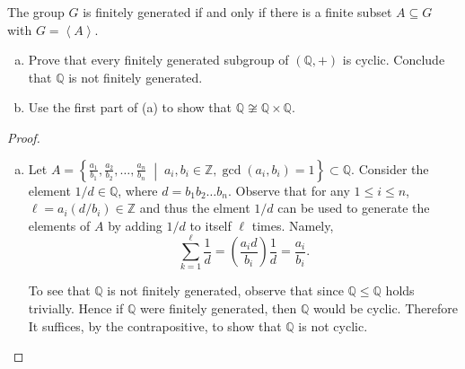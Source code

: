 \documentclass[10pt]{amsart}
\begin{document}
\begin{thm}
  The group $G$ is finitely generated if and only if there is a finite subset $A \subseteq G$ with $G = \left< A \right>$.
  
  \begin{enumerate}[(a)]
  \item
    Prove that every finitely generated subgroup of $(\mathbb{Q}, +)$ is cyclic.
    Conclude that $\mathbb{Q}$ is not finitely generated.
  \item
    Use the first part of (a) to show that $\mathbb{Q} \not \cong \mathbb{Q} \times \mathbb{Q}$.
  \end{enumerate}
  \begin{proof}
    \begin{enumerate}[(a)]
    \item
      Let $A = \left\{\frac{a_1}{b_1}, \frac{a_2}{b_2}, \ldots, \frac{a_n}{b_n} \;\middle\vert\; a_i, b_i \in \mathbb{Z}, \gcd(a_i,b_i) = 1\right\} \subset \mathbb{Q}$.
      Consider the element $1/d \in \mathbb{Q}$, where $d = b_1 b_2 \ldots b_n$.
      Observe that for any $1 \leq i \leq n$, $\ell = a_i(d/b_i) \in \mathbb{Z}$ and thus the elment $1/d$ can be used to generate the elements of $A$ by adding $1/d$ to itself $\ell$ times.
      Namely,
      $$\sum_{k=1}^{\ell} \frac{1}{d} = \left(\frac{a_i d}{b_i}\right)\frac{1}{d} = \frac{a_i}{b_i}.$$
      
      To see that $\mathbb{Q}$ is not finitely generated, observe that since $\mathbb{Q} \leq \mathbb{Q}$ holds trivially.
      Hence if $\mathbb{Q}$ were finitely generated, then $\mathbb{Q}$ would be cyclic.
      Therefore It suffices, by the contrapositive, to show that $\mathbb{Q}$ is not cyclic.


\end{enumerate}
\end{proof}
\end{thm}
\end{document}

